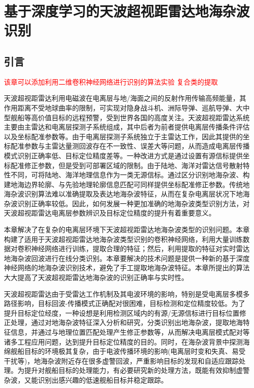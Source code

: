 \chapter{基于深度学习的天波超视距雷达地海杂波识别}
\section{引言}

\textcolor{red}{该章可以添加利用二维卷积神经网络进行识别的算法实验}
\textcolor{red}{复合类的提取}

天波超视距雷达利用电磁波在电离层与地/海面之间的反射作用传输高频能量，其作用距离不受地球曲率的限制，可实现对隐身战斗机、洲际导弹、巡航导弹、大中型舰船等高价值目标的远程预警，受到世界各国的高度关注。天波超视距雷达系统主要由主雷达和电离层探测子系统组成，其中后者为前者提供电离层传播条件评估以及坐标配准参数等。由于电离层探测子系统独立于主雷达工作，因此其提供的坐标配准参数与主雷达量测回波存在不一致性、误差大等问题，从而造成电离层传播模式识别正确率低、目标定位精度差等。一种改进方式是通过设置有源信标提供坐标配准修正参数，但是受到可部署区域的限制。由于陆地、海洋对雷达信号散射特性不同，可将陆地、海洋地理信息作为一类无源信标。通过区分识别地海杂波、构建地海边界轮廓、与先验地理轮廓信息匹配可同样提供坐标配准修正参数。传统地海杂波识别算法难以准确提取及表达地海杂波特征，从而在复杂电离层状况下地海杂波识别正确率较低。因此，如何发展一种更加准确的地海杂波类型识别方法，对天波超视距雷达电离层参数辨识及目标定位精度的提升有着重要意义。

本章解决了在复杂的电离层环境下天波超视距雷达地海杂波类型的识别问题。本章构建了适用于天波超视距雷达地海杂波类型识别的卷积神经网络，利用大量训练数据对卷积神经网络进行训练，提取合理的特征；然后，利用提取的特征对实时雷达地海杂波回波进行在线分类识别。本章要解决的技术问题是提供一种新的基于深度神经网络的地海杂波识别技术，避免了手工提取地海杂波特征。本章所提出的算法大大提高了天波超视距雷达地海杂波的识别正确率与实时性。

天波超视距雷达由于受雷达工作机制及其电波环境的影响，特别是受电离层多模多路径影响，目标回波-传播模式正确配对很困难，目标检测和定位精度较低。为了提升目标定位经度，一种设想是利用检测区域内的有源/无源信标进行目标位置修正处理，通过对地海杂波特征深入分析和研究，分类识别出地海杂波，提取地海特征信息，并通过与地理位置匹配处理产生修正参数等，从而解决电离层模式配对等诸多工程应用问题，达到提升目标定位精度的目的。同时，在海杂波背景中探测海绵舰船目标的环境极其复杂，由于电波传播环境的影响(电离层时变和失真、易受干扰等)，地海杂波附近存在很多虚警回波，严重影响目标的发现和自适应跟踪处理。为提升对舰船目标的处理能力，有必要研究新的处理方法，既能有效抑制虚警杂波，又能识别出感兴趣的低速舰船目标并稳定跟踪。

